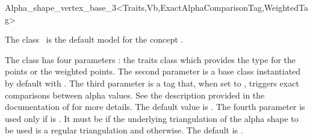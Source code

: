 \begin{ccRefClass}{Alpha_shape_vertex_base_3<Traits,Vb,ExactAlphaComparisonTag,WeightedTag>}

\ccDefinition

The class \ccRefName\ is the default  model for the concept
.

The class has four parameters : the traits class 
which provides the type for the points or the weighted points.
The second parameter  is a base class instantiated by default
with . 
The third parameter  is a tag that, when set to
, triggers exact comparisons between alpha values. See the description
provided in the documentation of  for more details. The default value is .
The fourth parameter  is used only if  is . It 
must be  if the underlying triangulation of the alpha shape to be used is a regular triangulation
and  otherwise. The default is .




\ccIsModel
{}


\ccInheritsFrom


\end{ccRefClass}
